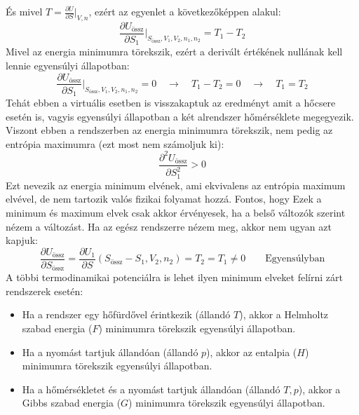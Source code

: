 \documentclass[a4paper,12pt]{article}
\begin{document}
És mivel $T = \frac{\partial U}{\partial S}\big|_{V,n}$, ezért az egyenlet a következőképpen alakul:
\begin{equation}
    \frac{\partial U_{\text{össz}}}{\partial S_1}\bigg|_{S_{\text{össz}}, V_1, V_2, n_1, n_2} = T_1 - T_2
\end{equation}
Mivel az energia minimumra törekszik, ezért a derivált értékének nullának kell lennie egyensúlyi állapotban:
\begin{equation}
    \frac{\partial U_{\text{össz}}}{\partial S_1}\bigg|_{S_{\text{össz}}, V_1, V_2, n_1, n_2} = 0 \quad \to \quad T_1 - T_2 = 0 \quad \to \quad T_1 = T_2
\end{equation}
Tehát ebben a virtuális esetben is visszakaptuk az eredményt amit a hőcsere esetén is, vagyis egyensúlyi állapotban a két alrendszer hőmérséklete megegyezik.
Viszont ebben a rendszerben az energia minimumra törekszik, nem pedig az entrópia maximumra (ezt most nem számoljuk ki):
\begin{equation}
    \frac{\partial^2 U_{\text{össz}}}{\partial S_1^2} > 0
\end{equation}
Ezt nevezik az energia minimum elvének, ami ekvivalens az entrópia maximum elvével, de nem tartozik valós fizikai folyamat hozzá. Fontos, hogy Ezek
a minimum és maximum elvek csak akkor érvényesek, ha a belső változók szerint nézem a változást. Ha az egész rendszerre nézem meg, akkor nem ugyan azt kapjuk:
\begin{equation}
    \frac{\partial U_{\text{össz}}}{\partial S_{\text{össz}}} = \frac{\partial U_1}{\partial S} (S_{\text{össz}} - S_1, V_2, n_2) = T_2 = T_1 \neq 0 \qquad \text{Egyensúlyban}
\end{equation}
A többi termodinamikai potenciálra is lehet ilyen minimum elveket felírni zárt rendszerek esetén:
\begin{itemize}
    \item Ha a rendszer egy hőfürdővel érintkezik (állandó $T$), akkor a Helmholtz szabad energia ($F$) minimumra törekszik egyensúlyi állapotban.
    \item Ha a nyomást tartjuk állandóan (állandó $p$), akkor az entalpia ($H$) minimumra törekszik egyensúlyi állapotban.
    \item Ha a hőmérsékletet és a nyomást tartjuk állandóan (állandó $T, p$), akkor a Gibbs szabad energia ($G$) minimumra törekszik egyensúlyi állapotban.
\end{itemize}
\end{document}
